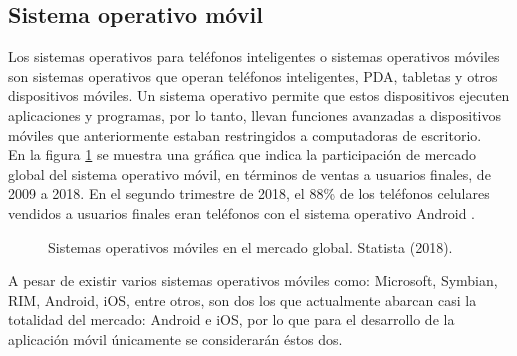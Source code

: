 
\subsection{Sistema operativo móvil}
Los sistemas operativos para teléfonos inteligentes o sistemas operativos móviles son sistemas operativos que operan teléfonos inteligentes, PDA, tabletas y otros dispositivos móviles. Un sistema operativo permite que estos dispositivos ejecuten aplicaciones y programas, por lo tanto, llevan funciones avanzadas a dispositivos móviles que anteriormente estaban restringidos a computadoras de escritorio. \\

En la figura \ref{fig:grafica_mercadoOS} se muestra una gráfica que indica la participación de mercado global del sistema operativo móvil, en términos de ventas a usuarios finales, de 2009 a 2018. En el segundo trimestre de 2018, el 88\% de los teléfonos celulares vendidos a usuarios finales eran teléfonos con el sistema operativo Android \cite{mercadoOS}. \\

\begin{figure}[htbp!]
	\centering
	\caption{Sistemas operativos móviles en el mercado global. Statista (2018).}
	\label{fig:grafica_mercadoOS}
\end{figure}

A pesar de existir varios sistemas operativos móviles como: Microsoft, Symbian, RIM, Android, iOS, entre otros, son dos los que actualmente abarcan casi la totalidad del mercado: Android e iOS, por lo que para el desarrollo de la aplicación móvil únicamente se considerarán éstos dos. \\

